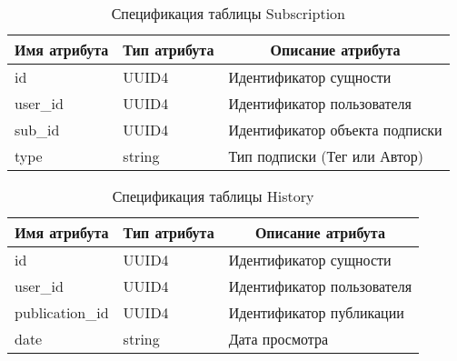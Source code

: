 \documentclass{bmstu-gost-7-32}
\begin{document}
\begin{table}[H]
	\caption{Спецификация таблицы Subscription}
	\begin{tabular}{|l|l|l|}
		\hline
		\multicolumn{1}{|c|}{\textbf{Имя атрибута}} & \multicolumn{1}{c|}{\textbf{Тип атрибута}} & \multicolumn{1}{c|}{\textbf{Описание атрибута}} \\ \hline
		id                                          & UUID4                                      & Идентификатор сущности                          \\ \hline
		user\_id                                    & UUID4                                      & Идентификатор пользователя                      \\ \hline
		sub\_id                                     & UUID4                                      & Идентификатор объекта подписки                  \\ \hline
		type                                        & string                                     & Тип подписки (Тег или Автор)                    \\ \hline
	\end{tabular}
\end{table}

\begin{table}[H]
	\caption{Спецификация таблицы History}
	\begin{tabular}{|l|l|l|}
		\hline
		\multicolumn{1}{|c|}{\textbf{Имя атрибута}} & \multicolumn{1}{c|}{\textbf{Тип атрибута}} & \multicolumn{1}{c|}{\textbf{Описание атрибута}} \\ \hline
		id                                          & UUID4                                      & Идентификатор сущности                          \\ \hline
		user\_id                                    & UUID4                                      & Идентификатор пользователя                      \\ \hline
		publication\_id                             & UUID4                                      & Идентификатор публикации                        \\ \hline
		date                                        & string                                     & Дата просмотра                                  \\ \hline
	\end{tabular}
\end{table}
\end{document}
